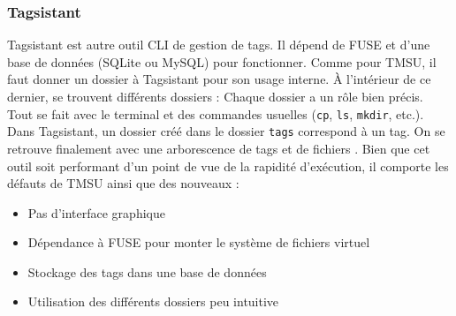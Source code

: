 \documentclass[a4paper, 12pt]{article}
\begin{document}
\subsubsection{Tagsistant}
Tagsistant \cite{ref16} est autre outil CLI de gestion de tags. Il dépend de FUSE et d'une base 
de données (SQLite ou MySQL) pour fonctionner. Comme pour TMSU, il faut donner un dossier à Tagsistant 
pour son usage interne. À l'intérieur de ce dernier, se trouvent différents dossiers :
\bigbreak
Chaque dossier a un rôle bien précis. Tout se fait avec le terminal et des commandes usuelles 
(\texttt{cp}, \texttt{ls}, \texttt{mkdir}, etc.). Dans Tagsistant, 
un dossier créé dans le dossier \texttt{tags} correspond à un tag. On se retrouve 
finalement avec une arborescence de tags et de fichiers \cite{ref17}. Bien que cet outil soit 
performant d'un point de vue de la rapidité d'exécution, il comporte les défauts de TMSU ainsi que 
des nouveaux :
\begin{itemize}
    \item Pas d'interface graphique
    \item Dépendance à FUSE pour monter le système de fichiers virtuel
    \item Stockage des tags dans une base de données
    \item Utilisation des différents dossiers peu intuitive
\end{itemize} 
\end{document}
